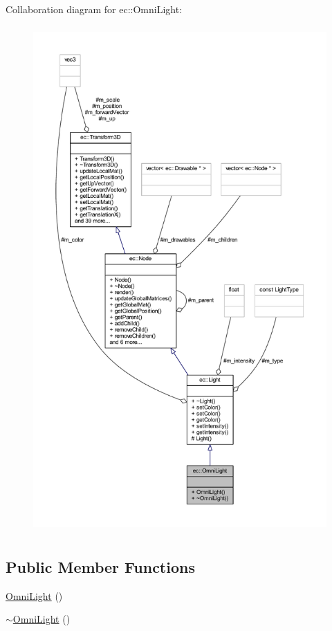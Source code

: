 Collaboration diagram for ec\+:\+:Omni\+Light\+:\nopagebreak
\begin{figure}[H]
\begin{center}
\leavevmode
\includegraphics[height=550pt]{classec_1_1_omni_light__coll__graph}
\end{center}
\end{figure}
\subsection*{Public Member Functions}
\begin{DoxyCompactItemize}
\item 
\mbox{\hyperlink{classec_1_1_omni_light_aa0240a42641c82a0363f569fdc312f23}{Omni\+Light}} ()
\item 
\mbox{\hyperlink{classec_1_1_omni_light_a58c4d1aaf29e659c03ee1193cbca3eed}{$\sim$\+Omni\+Light}} ()
\end{DoxyCompactItemize}

